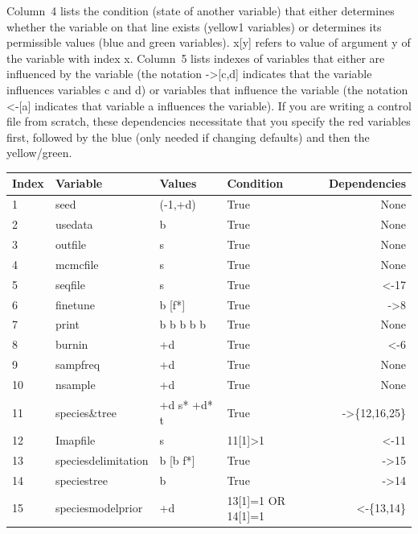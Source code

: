 \documentclass{book}
\numberwithin{equation}{section} \renewcommand{\baselinestretch}{0.55}
\begin{document}
Column~4 lists the condition (state of another variable) that either
determines whether the variable on that line exists (yellow1
variables) or determines its permissible values (blue and green
variables).  x[y] refers to value of argument y of the variable with
index x. Column~5 lists indexes of variables that either are
influenced by the variable (the notation ->[c,d] indicates that the
variable influences variables c and d) or variables that influence the
variable (the notation <-[a] indicates that variable a influences the
variable). If you are writing a control file from scratch, these
dependencies necessitate that you specify the red variables first,
followed by the blue (only needed if changing defaults) and then the
yellow/green.
\newpage
\begin{table}[h]
  \begin{center}
    {\small
    \begin{tabular}{@{}llllr@{}}
      \toprule
      Index & Variable & Values & Condition & Dependencies \\ \midrule
      1 & {\color{blue} seed} & (-1,+d) & True & None \\
      2 & {\color{blue} usedata} & b & True & None \\
      3 & {\color{red} outfile} & s & True& None \\
      4 & {\color{red} mcmcfile} & s & True & None \\
      5 & {\color{red} seqfile} & s & True & <-17 \\
      6 & {\color{red} finetune} & b [f*] & True & ->8 \\
      7 & {\color{red} print} & b b b b b & True & None \\
      8 & {\color{yellow1} burnin} & +d & True & <-6 \\
      9 & {\color{red} sampfreq} & +d & True & None \\
      10 & {\color{red} nsample} & +d & True & None \\
      11 & {\color{red} species\&tree} & +d s* +d* t & True & ->\{12,16,25\}  \\  
      12 & {\color{yellow1} Imapfile} & s & 11[1]>1 & <-11 \\
      13 & {\color{blue} speciesdelimitation} & b [b f*] & True & ->15 \\
      14 & {\color{blue} speciestree} & b & True & ->14 \\
      15 & {\color{yellow1} speciesmodelprior} & +d  & 13[1]=1 OR 14[1]=1 & <-\{13,14\} \\

\end{tabular}}
\end{center}
\end{table}
\end{document}

